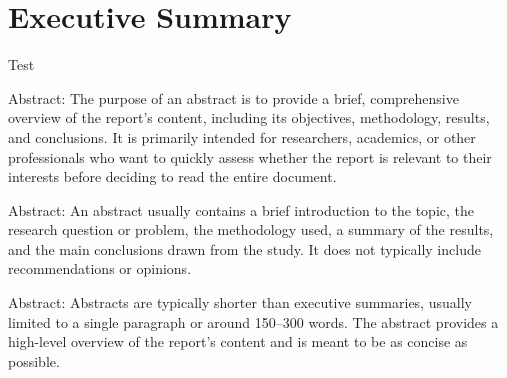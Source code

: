 \documentclass{article}
\begin{document}

    \section*{Executive Summary}

    Test\cite{lol}

    \iffalse

    Abstract: The purpose of an abstract is to provide a brief, comprehensive overview of the report's content,
    including its objectives, methodology, results, and conclusions.
    It is primarily intended for researchers, academics, or other professionals who want to quickly assess whether the
    report is relevant to their interests before deciding to read the entire document.

    Abstract: An abstract usually contains a brief introduction to the topic, the research question or problem,
    the methodology used, a summary of the results, and the main conclusions drawn from the study.
    It does not typically include recommendations or opinions.

    Abstract: Abstracts are typically shorter than executive summaries, usually limited to a single paragraph or around
    150--300 words.
    The abstract provides a high-level overview of the report's content and is meant to be as concise as possible.
\end{document}
